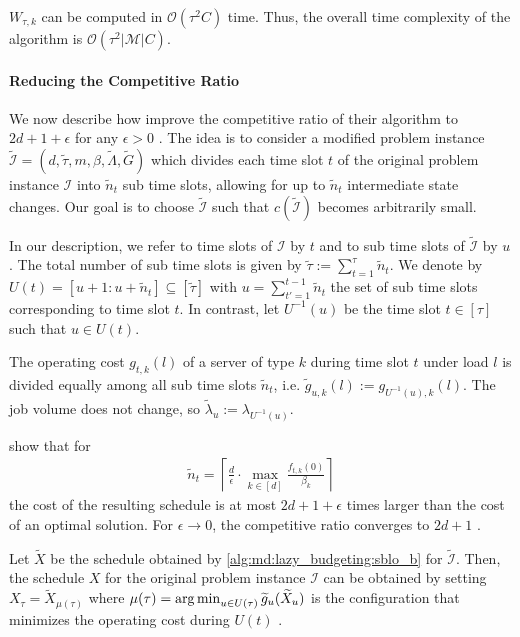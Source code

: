$W_{\tau,k}$ can be computed in $\mathcal{O}(\tau^2 C)$ time. Thus, the overall time complexity of the algorithm is $\mathcal{O}(\tau^2 |\mathcal{M}| C)$.

\paragraph{Reducing the Competitive Ratio}

We now describe how \citeauthor*{Albers2021_2} improve the competitive ratio of their algorithm to $2d + 1 + \epsilon$ for any $\epsilon > 0$ \cite{Albers2021_2}. The idea is to consider a modified problem instance $\widetilde{\mathcal{I}} = (d, \widetilde{\tau}, m, \beta, \widetilde{\Lambda}, \widetilde{G})$ which divides each time slot $t$ of the original problem instance $\mathcal{I}$ into $\widetilde{n}_t$ sub time slots, allowing for up to $\widetilde{n}_t$ intermediate state changes. Our goal is to choose $\widetilde{\mathcal{I}}$ such that $c(\widetilde{\mathcal{I}})$ becomes arbitrarily small.

In our description, we refer to time slots of $\mathcal{I}$ by $t$ and to sub time slots of $\widetilde{\mathcal{I}}$ by $u$. The total number of sub time slots is given by $\widetilde{\tau} := \sum_{t=1}^{\tau} \widetilde{n}_t$. We denote by $U(t) = [u+1 : u+\widetilde{n}_t] \subseteq [\widetilde{\tau}]$ with $u = \sum_{t'=1}^{t-1} \widetilde{n}_t$ the set of sub time slots corresponding to time slot $t$. In contrast, let $U^{-1}(u)$ be the time slot $t \in [\tau]$ such that $u \in U(t)$.

The operating cost $g_{t,k}(l)$ of a server of type $k$ during time slot $t$ under load $l$ is divided equally among all sub time slots $\widetilde{n}_t$, i.e. $\widetilde{g}_{u,k}(l) := g_{U^{-1}(u),k}(l)$. The job volume does not change, so $\widetilde{\lambda}_u := \lambda_{U^{-1}(u)}$.

\citeauthor*{Albers2021_2} show that for \begin{align*}
    \widetilde{n}_t = \left\lceil\frac{d}{\epsilon} \cdot \max_{k \in [d]} \frac{f_{t,k}(0)}{\beta_k}\right\rceil
\end{align*} the cost of the resulting schedule is at most $2d + 1 + \epsilon$ times larger than the cost of an optimal solution. For $\epsilon \to 0$, the competitive ratio converges to $2d + 1$ \cite{Albers2021_2}.

Let $\widetilde{X}$ be the schedule obtained by \autoref{alg:md:lazy_budgeting:sblo_b} for $\widetilde{\mathcal{I}}$. Then, the schedule $X$ for the original problem instance $\mathcal{I}$ can be obtained by setting $X_{\tau} = \widetilde{X}_{\mu(\tau)}$ where $\mu(\tau) = \operatorname*{arg\,min}_{u \in U(\tau)} \widetilde{g}_{u}(\widetilde{X}_u)$ is the configuration that minimizes the operating cost during $U(t)$ \cite{Albers2021_2}.

